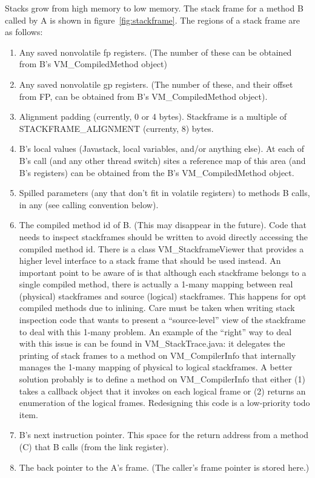 Stacks grow from high memory to low memory.  The stack frame for a method
B called by A is shown in figure~\ref{fig:stackframe}. The regions of
a stack frame are as follows:
\begin{enumerate}
\item Any saved nonvolatile fp registers.  (The number of these can be
obtained from B's VM\_CompiledMethod object)
\item Any saved nonvolatile gp registers.  (The number of these, and
their offset from FP, can be obtained from B's VM\_CompiledMethod
object).
\item Alignment padding (currently, 0 or 4 bytes).  Stackframe is a
multiple of STACKFRAME\_ALIGNMENT (currenty, 8) bytes.
\item B's local values (Java\trademark stack, local variables, and/or anything
else). At each of B's call (and any other thread switch) sites a
reference map of this area (and B's registers) can be obtained from
the B's VM\_CompiledMethod object.
\item Spilled parameters (any that don't fit in volatile registers) to
methods B calls, in any (see calling convention below). 
\item The compiled method id of B.  (This may disappear in the
future). Code that needs to inspect stackframes should be written to
avoid directly accessing the compiled method id.  There is a class
VM\_StackframeViewer that provides a higher level interface
to a stack frame that should be used instead.  An important point to
be aware of is that although each stackframe belongs to a single
compiled method, there is actually a 1-many mapping between real
(physical) stackframes and source (logical) stackframes.  This happens
for opt compiled methods due to inlining. Care must be taken when
writing stack inspection code that wants to present a ``source-level''
view of the stackframe to deal with this 1-many problem. 
An example of the ``right'' way to deal with this issue is
can be found in VM\_StackTrace.java: it delegates the printing of stack
frames to a method on VM\_CompilerInfo that internally manages the
1-many mapping of physical to logical stackframes.  A better solution
probably is to define a method on VM\_CompilerInfo that either (1)
takes a callback object that it invokes on each logical frame or (2)
returns an enumeration of the logical frames. Redesigning this code is
a low-priority todo item.
\item B's next instruction pointer.  This space for the return address
from a method (C) that B calls (from the link register).
\item The back pointer to the A's frame.  (The caller's frame pointer
is stored here.) 
\end{enumerate}


